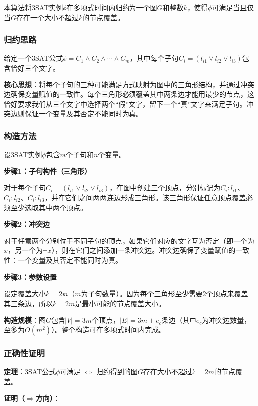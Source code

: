 \documentclass{sysucseexp}
\begin{document}
本算法将3SAT实例$\phi$在多项式时间内归约为一个图$G$和整数$k$，使得$\phi$可满足当且仅当$G$存在一个大小不超过$k$的节点覆盖。

\subsubsection{归约思路}

给定一个3SAT公式$\phi = C_1 \land C_2 \land \cdots \land C_m$，其中每个子句$C_i = (l_{i1} \lor l_{i2} \lor l_{i3})$包含恰好三个文字。

\textbf{核心思想}：将每个子句的三种可能满足方式映射为图中的三角形结构，并通过冲突边确保变量赋值的一致性。每个三角形必须覆盖其中两条边才能用最少的节点，这恰好要求我们从三个文字中选择两个``假''文字，留下一个``真''文字来满足子句。冲突边则保证一个变量及其否定不能同时为真。

\subsubsection{构造方法}

设3SAT实例$\phi$包含$m$个子句和$n$个变量。

\textbf{步骤1：子句构件（三角形）}

对于每个子句$C_i = (l_{i1} \lor l_{i2} \lor l_{i3})$，在图中创建三个顶点，分别标记为$C_i{:}l_{i1}$、$C_i{:}l_{i2}$、$C_i{:}l_{i3}$，并在它们之间两两连边形成三角形。该三角形保证任意顶点覆盖必须至少选取其中两个顶点。

\textbf{步骤2：冲突边}

对于任意两个分别位于不同子句的顶点，如果它们对应的文字互为否定（即一个为$x$，另一个为$\neg x$），则在它们之间添加一条冲突边。冲突边确保了变量赋值的一致性：一个变量及其否定不能同时为真。

\textbf{步骤3：参数设置}

设定覆盖大小$k = 2m$（$m$为子句数量）。因为每个三角形至少需要2个顶点来覆盖其三条边，所以$k = 2m$是最小可能的节点覆盖大小。

\textbf{构造规模}：图$G$包含$|V| = 3m$个顶点，$|E| = 3m + e_c$条边（其中$e_c$为冲突边数量，至多为$O(m^2)$）。整个构造可在多项式时间内完成。

\subsubsection{正确性证明}

\textbf{定理}：3SAT公式$\phi$可满足 $\Leftrightarrow$ 归约得到的图$G$存在大小不超过$k = 2m$的节点覆盖。

\textbf{证明（$\Rightarrow$方向）}：
\end{document}
